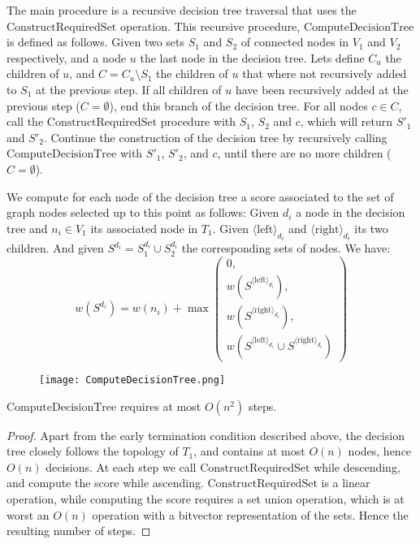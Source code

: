 			The main procedure is a recursive decision tree traversal that uses the $\text{ConstructRequiredSet}$ operation.
			This recursive procedure, $\text{ComputeDecisionTree}$ is defined as follows.
			Given two sets $S_1$ and $S_2$ of connected nodes in $V_1$ and $V_2$ respectively, and a node $u$ the last node in the decision tree.
			Lets define $C_u$ the children of $u$, and $C = C_u \setminus S_1$ the children of $u$ that where not recursively added to $S_1$ at the previous step.
			If all children of $u$ have been recursively added at the previous step ($C = \emptyset$), end this branch of the decision tree.
			For all nodes $c \in C$, call the $\text{ConstructRequiredSet}$ procedure with $S_1$, $S_2$ and $c$, which will return $S'_1$ and $S'_2$.
			Continue the construction of the decision tree by recursively calling $\text{ComputeDecisionTree}$ with $S'_1$, $S'_2$, and $c$, until there are no more children ($C = \emptyset$).

			We compute for each node of the decision tree a score associated to the set of graph nodes selected up to this point as follows: Given $d_i$ a node in the decision tree and $n_i \in V_1$ its associated node in $T_1$.
			Given ${\langle \text{left}\rangle}_{d_i}$ and ${\langle \text{right}\rangle}_{d_i}$ its two children. And given $S^{d_i} = S_1^{d_i} \cup S_2^{d_i}$ the corresponding sets of nodes. We have:
			\[
			w(S^{d_i}) = w(n_i) + \max\left(\begin{array}{c}
				0,\\
				w\left(S^{{\langle \text{left}\rangle}_{d_i}}\right),\\
				w\left(S^{{\langle \text{right}\rangle}_{d_i}}\right),\\
				w\left(S^{{\langle \text{left}\rangle}_{d_i}} \cup S^{{\langle \text{right}\rangle}_{d_i}}\right)
			\end{array}\right)
			\]
			
			\begin{figure}[ht]
				\centering
				\texttt{[image: ComputeDecisionTree.png]}
				\label{fig:foo}
			\end{figure}

			\begin{proposition}\label{sec:apx-bt}
				$\text{ComputeDecisionTree}$ requires at most $O(n^2)$ steps.
			\end{proposition}
			\begin{proof}
				Apart from the early termination condition described above, the decision tree closely follows the topology of $T_1$, and contains at most $O(n)$ nodes, hence $O(n)$ decisions.
				At each step we call $\text{ConstructRequiredSet}$ while descending, and compute the score while ascending.
				$\text{ConstructRequiredSet}$ is a linear operation, while computing the score requires a set union operation, which is at worst an $O(n)$ operation with a bitvector representation of the sets.
				Hence the resulting number of steps.
			\end{proof}

